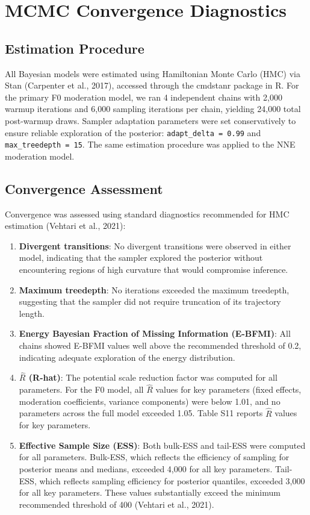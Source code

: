 \documentclass[
  english,
  man,floatsintext]{apa6}
\begin{document}
\newpage

\section{MCMC Convergence Diagnostics}\label{mcmc-convergence-diagnostics}

\subsection{Estimation Procedure}\label{estimation-procedure}

All Bayesian models were estimated using Hamiltonian Monte Carlo (HMC) via Stan (Carpenter et al., 2017), accessed through the cmdstanr package in R. For the primary F0 moderation model, we ran 4 independent chains with 2,000 warmup iterations and 6,000 sampling iterations per chain, yielding 24,000 total post-warmup draws. Sampler adaptation parameters were set conservatively to ensure reliable exploration of the posterior: \texttt{adapt\_delta\ =\ 0.99} and \texttt{max\_treedepth\ =\ 15}. The same estimation procedure was applied to the NNE moderation model.

\subsection{Convergence Assessment}\label{convergence-assessment}

Convergence was assessed using standard diagnostics recommended for HMC estimation (Vehtari et al., 2021):

\begin{enumerate}
\def\labelenumi{\arabic{enumi}.}
\item
  \textbf{Divergent transitions}: No divergent transitions were observed in either model, indicating that the sampler explored the posterior without encountering regions of high curvature that would compromise inference.
\item
  \textbf{Maximum treedepth}: No iterations exceeded the maximum treedepth, suggesting that the sampler did not require truncation of its trajectory length.
\item
  \textbf{Energy Bayesian Fraction of Missing Information (E-BFMI)}: All chains showed E-BFMI values well above the recommended threshold of 0.2, indicating adequate exploration of the energy distribution.
\item
  \textbf{\(\hat{R}\) (R-hat)}: The potential scale reduction factor was computed for all parameters. For the F0 model, all \(\hat{R}\) values for key parameters (fixed effects, moderation coefficients, variance components) were below 1.01, and no parameters across the full model exceeded 1.05. Table S11 reports \(\hat{R}\) values for key parameters.
\item
  \textbf{Effective Sample Size (ESS)}: Both bulk-ESS and tail-ESS were computed for all parameters. Bulk-ESS, which reflects the efficiency of sampling for posterior means and medians, exceeded 4,000 for all key parameters. Tail-ESS, which reflects sampling efficiency for posterior quantiles, exceeded 3,000 for all key parameters. These values substantially exceed the minimum recommended threshold of 400 (Vehtari et al., 2021).
\end{enumerate}
\end{document}

